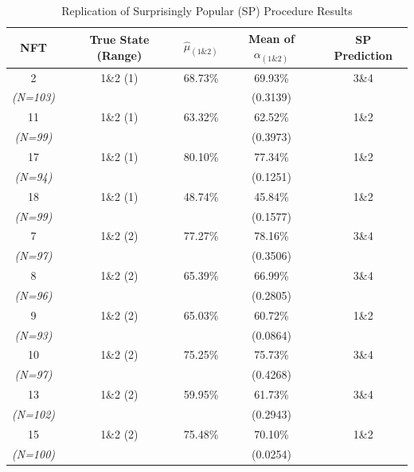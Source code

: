 \documentclass[12pt,reqno]{amsart}
\begin{document}
\begin{table}[htbp]\centering
\scriptsize
\begin{threeparttable}
\caption{Replication of Surprisingly Popular (SP) Procedure Results}\label{tab:sp_replication}
\setlength{\tabcolsep}{4pt}
\renewcommand{\arraystretch}{0.95}
\begin{tabular}{ccccc}
\toprule
\textbf{NFT} & \textbf{True State (Range)} & $\hat{\mu}_{(1\&2)}$ & \textbf{Mean of }$\alpha_{(1\&2)}$ & \textbf{SP Prediction}\\
\midrule
2 & 1\&2 (1) & 68.73\% & 69.93\% & 3\&4 \\
   \textit{(N=103)} & & & (0.3139) & \\

11 & 1\&2 (1) & 63.32\% & 62.52\% & 1\&2 \\
    \textit{(N=99)} & & & (0.3973) & \\

17 & 1\&2 (1) & 80.10\% & 77.34\% & 1\&2 \\
   \textit{(N=94)} & & & (0.1251) & \\

18 & 1\&2 (1) & 48.74\% & 45.84\% & 1\&2 \\
   \textit{(N=99)} & & & (0.1577) & \\
\midrule
7 & 1\&2 (2) & 77.27\% & 78.16\% & 3\&4 \\
  \textit{(N=97)} & & & (0.3506) & \\

8 & 1\&2 (2) & 65.39\% & 66.99\% & 3\&4 \\
   \textit{(N=96)} & & & (0.2805) & \\

9 & 1\&2 (2) & 65.03\% & 60.72\% & 1\&2 \\
   \textit{(N=93)} & & & (0.0864) & \\

10 & 1\&2 (2) & 75.25\% & 75.73\% & 3\&4 \\
    \textit{(N=97)} & & & (0.4268) & \\

13 & 1\&2 (2) & 59.95\% & 61.73\% & 3\&4 \\
    \textit{(N=102)} & & & (0.2943) & \\

15 & 1\&2 (2) & 75.48\% & 70.10\% & 1\&2 \\
    \textit{(N=100)} & & & (0.0254) & \\


\end{tabular}
\end{threeparttable}
\end{table}
\end{document}
